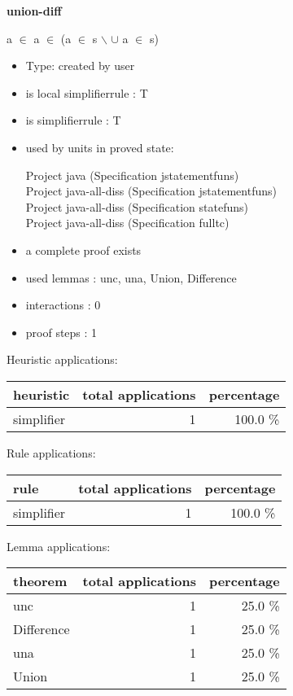 \documentclass[a4paper]{article}
\begin{document}
{\LARGE\bf union-diff}\label{lemma-union-diff}

\medskip

 \Fol \Not a $\in$  \And \Not a $\in$  \Imp (a $\in$ s $\backslash$  $\cup$  \Equiv a $\in$ s)

\begin{itemize}

\item Type: created by user

\item is local simplifierrule : T
\item is simplifierrule : T
\item used by units in proved state:

Project java (Specification jstatementfuns) \\
Project java-all-diss (Specification jstatementfuns) \\
Project java-all-diss (Specification statefuns) \\
Project java-all-diss (Specification fulltc)
\item       a complete proof exists
\item       used lemmas  : unc, una, Union, Difference
\item       interactions : 0
\item       proof steps  : 1
\end{itemize}

\medskip


Heuristic applications:

\begin{supertabular}{l|r|r}
heuristic	& total applications & percentage \\ \hline
simplifier & 1 & 100.0 \% \\

\end{supertabular}

Rule applications:

\begin{supertabular}{l|r|r}
rule	        & total applications & percentage \\ \hline
simplifier & 1 & 100.0 \% \\

\end{supertabular}

Lemma applications:

\begin{supertabular}{l|r|r}
theorem	        & total applications & percentage \\ \hline
unc & 1 & 25.0 \% \\
Difference & 1 & 25.0 \% \\
una & 1 & 25.0 \% \\
Union & 1 & 25.0 \% \\

\end{supertabular}
\pagebreak
\end{document}
